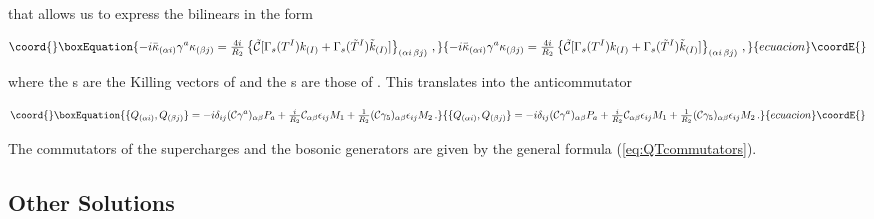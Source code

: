 \documentclass[12pt,a4paper]{article}
\begin{document}
\noindent
that allows us to express the bilinears in the form

\begin{equation}\coord{}\boxEquation{
-i\bar{\kappa}_{(\alpha i)}\gamma^{a}\kappa_{(\beta j)}= 
{\textstyle\frac{4i}{R_{2}}}
\left\{\tilde{\mathcal{C}}[\Gamma_{s}(T^{I})k_{(I)}
+\Gamma_{s}(\tilde{T}^{I})\tilde{k}_{(I)}]
 \right\}_{(\alpha i\, \beta j)}\, ,  
}{
-i\bar{\kappa}_{(\alpha i)}\gamma^{a}\kappa_{(\beta j)}= 
{\textstyle\frac{4i}{R_{2}}}
\left\{\tilde{\mathcal{C}}[\Gamma_{s}(T^{I})k_{(I)}
+\Gamma_{s}(\tilde{T}^{I})\tilde{k}_{(I)}]
 \right\}_{(\alpha i\, \beta j)}\, ,  
}{ecuacion}\coordE{}\end{equation}

\noindent
where the \coordHE{}s are the Killing vectors of \coordHE{} and the
\coordHE{}s are those of \coordHE{}. This translates into the
anticommutator

\begin{equation}\coord{}\boxEquation{
\{Q_{(\alpha i)},Q_{(\beta j)}\} =
-i\delta_{ij}(\mathcal{C}\gamma^{a})_{\alpha\beta}P_{a}
+{\textstyle\frac{i}{R_{2}}}\mathcal{C}_{\alpha\beta}  \epsilon_{ij} M_{1}
+{\textstyle\frac{1}{R_{2}}}(\mathcal{C}\gamma_{5})_{\alpha\beta}  
\epsilon_{ij} M_{2}\, .
}{
\{Q_{(\alpha i)},Q_{(\beta j)}\} =
-i\delta_{ij}(\mathcal{C}\gamma^{a})_{\alpha\beta}P_{a}
+{\textstyle\frac{i}{R_{2}}}\mathcal{C}_{\alpha\beta}  \epsilon_{ij} M_{1}
+{\textstyle\frac{1}{R_{2}}}(\mathcal{C}\gamma_{5})_{\alpha\beta}  
\epsilon_{ij} M_{2}\, .
}{ecuacion}\coordE{}\end{equation}

The commutators of the supercharges and the bosonic generators are
given by the general formula (\ref{eq:QTcommutators}).



\subsection{Other \coordHE{} Solutions}
\label{sec-AdSxS}
\end{document}
